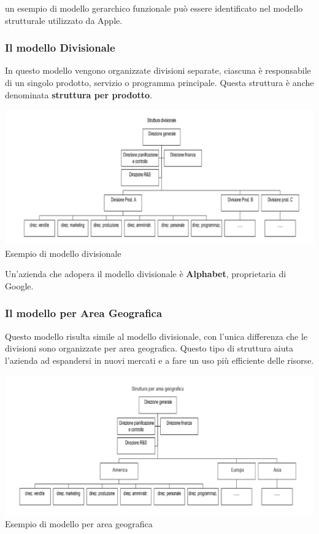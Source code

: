 \documentclass[14pt]{extarticle}
\begin{document}
un esempio di modello gerarchico funzionale può essere identificato nel modello
strutturale utilizzato da Apple.

\subsubsection{Il modello Divisionale}

In questo modello vengono organizzate divisioni separate, ciascuna è
responsabile di un singolo prodotto, servizio o programma principale. Questa
struttura è anche denominata \textbf{struttura per prodotto}.

\begin{center}
    \includegraphics[scale = 0.50]{images/modello_divisionale.png}
    Esempio di modello divisionale
\end{center}

Un'azienda che adopera il modello divisionale è \textbf{Alphabet}, proprietaria
di Google.

\subsubsection{Il modello per Area Geografica}

Questo modello risulta simile al modello divisionale, con l'unica differenza che
le divisioni sono organizzate per area geografica. Questo tipo di struttura
aiuta l'azienda ad espandersi in nuovi mercati e a fare un uso più efficiente
delle risorse.

\begin{center}
    \includegraphics[scale=0.50]{images/modello_geografico.png}
    Esempio di modello per area geografica
\end{center}
\end{document}
